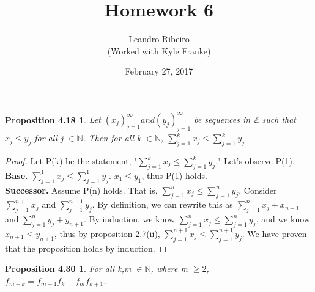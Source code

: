 \documentclass[12pt]{amsart}
\newcommand{\N}{\mathbb{N}}
\newcommand{\Z}{\mathbb{Z}}
\begin{document}
\title{Homework 6}
\date{February 27, 2017}
\author{Leandro Ribeiro\\(Worked with Kyle Franke)}

\maketitle

\newtheorem*{prop4.18}{Proposition 4.18}
\begin{prop4.18}
	Let $(x_j)_{j=1}^{\infty} and (y_j)_{j=1}^{\infty}$ be sequences in $\Z$ such that $x_j \leq y_j$ for all j $\in \N$. Then for all k $\in \N$,
	$\sum\limits_{j=1}^{k} x_j \leq \sum\limits_{j=1}^{k} y_j$.
\end{prop4.18}

\begin{proof}
	Let P(k) be the statement, "$\sum\limits_{j=1}^{k} x_j \leq \sum\limits_{j=1}^{k} y_j$." Let's observe P(1).
	\\\textbf{Base.} $\sum\limits_{j=1}^{1} x_j \leq \sum\limits_{j=1}^{1} y_j$. $x_1 \leq y_1$, thus P(1) holds.
	\\\textbf{Successor.} Assume P(n) holds. That is, $\sum\limits_{j=1}^{n} x_j \leq \sum\limits_{j=1}^{n} y_j$. Consider $\sum\limits_{j=1}^{n+1} x_j$ and $\sum\limits_{j=1}^{n+1} y_j$. By definition, we can rewrite this as $\sum\limits_{j=1}^{n} x_j + x_{n+1}$ and $\sum\limits_{j=1}^{n} y_j + y_{n+1}$. By induction, we know $\sum\limits_{j=1}^{n} x_j \leq \sum\limits_{j=1}^{n} y_j$, and we know $x_{n+1} \leq y_{n+1}$, thus by proposition 2.7(ii), $\sum\limits_{j=1}^{n+1} x_j \leq \sum\limits_{j=1}^{n+1} y_j$. We have proven that the proposition holds by induction.
\end{proof}

\newtheorem*{prop4.30}{Proposition 4.30}
\begin{prop4.30}
	For all k,m $\in \N$, where m $\geq 2$,\\\indent $f_{m+k} = f_{m-1}f_{k} + f_mf_{k+1}$.
\end{prop4.30}
\end{document}
